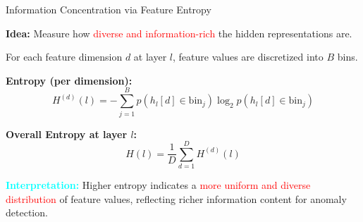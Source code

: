 \documentclass[aspectratio=169,xcolor=dvipsnames]{beamer}
\begin{document}
	
	\begin{frame}{Information Concentration via Feature Entropy}
		\small
		
		\textbf{Idea:} Measure how \textcolor{red}{diverse and information-rich} the hidden representations are.
		
		\vspace{0.8em}
		
		For each feature dimension $d$ at layer $l$, feature values are discretized into $B$ bins.
		
		\vspace{0.5em}
		
		\textbf{Entropy (per dimension):}
		\[
		H^{(d)}(l) =
		- \sum_{j=1}^{B}
		p(h_l[d] \in \text{bin}_j)
		\log_2 p(h_l[d] \in \text{bin}_j)
		\]
		
		\vspace{0.8em}
		
		\textbf{Overall Entropy at layer $l$:}
		\[
		H(l) = \frac{1}{D} \sum_{d=1}^{D} H^{(d)}(l)
		\]
		
		\vspace{1em}
		
		\textcolor{cyan}{\textbf{Interpretation:}}  
		Higher entropy indicates a \textcolor{red}{more uniform and diverse distribution} of feature values, reflecting richer information content for anomaly detection.
		
	\end{frame}
	
\end{document}
